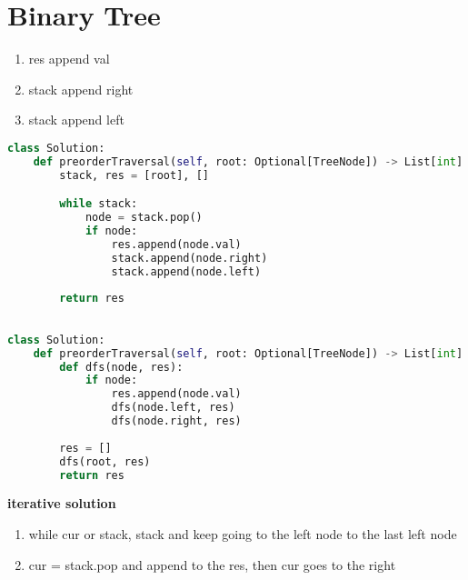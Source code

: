 \documentclass{assignmeownt}
\begin{document}
\maketitle
\thispagestyle{firststyle}


\tableofcontents
\newpage



\section{Binary Tree}


\begin{enumerate}
    \item res append val
    \item stack append right
    \item stack append left
\end{enumerate}


\begin{lstlisting}[language=Python, caption=pre-order traversal dfs]
class Solution:
    def preorderTraversal(self, root: Optional[TreeNode]) -> List[int]:
        stack, res = [root], []

        while stack:
            node = stack.pop()
            if node:
                res.append(node.val)
                stack.append(node.right)
                stack.append(node.left)
        
        return res
\end{lstlisting}

\begin{lstlisting}[language=Python, caption=pre-order traversal dp]

class Solution:
    def preorderTraversal(self, root: Optional[TreeNode]) -> List[int]:
        def dfs(node, res):
            if node:
                res.append(node.val)
                dfs(node.left, res)
                dfs(node.right, res)
        
        res = []
        dfs(root, res)
        return res
\end{lstlisting}


\textbf{iterative solution}
\begin{enumerate}
    \item while cur or stack, stack and keep going to the left node to the last left node
    \item cur = stack.pop and append to the res, then cur goes to the right
\end{enumerate}
\end{document}
